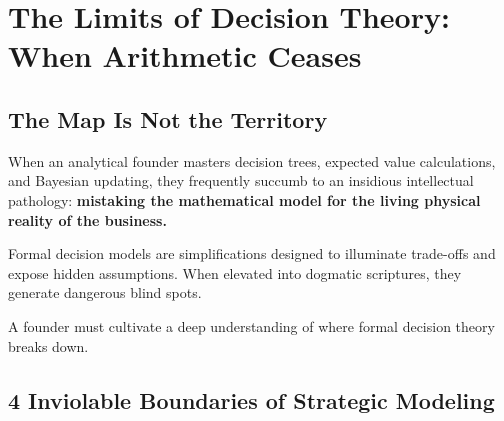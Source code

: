 \section{The Limits of Decision Theory: When Arithmetic Ceases}

\subsection{The Map Is Not the Territory}

When an analytical founder masters decision trees, expected value calculations, and Bayesian updating, they frequently succumb to an insidious intellectual pathology: \textbf{mistaking the mathematical model for the living physical reality of the business.}

Formal decision models are simplifications designed to illuminate trade-offs and expose hidden assumptions. When elevated into dogmatic scriptures, they generate dangerous blind spots.

A founder must cultivate a deep understanding of where formal decision theory breaks down.

\subsection{4 Inviolable Boundaries of Strategic Modeling}

